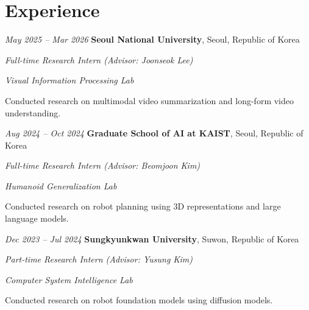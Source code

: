 \section{Experience}

\begin{twocolentry}{\textit{May 2025 – Mar 2026}}
    \textbf{Seoul National University}, Seoul, Republic of Korea

    \textit{Full-time Research Intern (Advisor: Joonseok Lee)}

    \textit{Visual Information Processing Lab}\href{https://viplab.snu.ac.kr/viplab/index.html}{}
\end{twocolentry}
\begin{onecolentry}
    \begin{highlights}
        \item Conducted research on multimodal video summarization and long-form video understanding.
    \end{highlights}
\end{onecolentry}

\vspace{0.1 cm}

\begin{twocolentry}{\textit{Aug 2024 – Oct 2024}}
    \textbf{Graduate School of AI at KAIST}, Seoul, Republic of Korea

    \textit{Full-time Research Intern (Advisor: Beomjoon Kim)}

    \textit{Humanoid Generalization Lab}\href{https://www.hugelab.org/}{}
\end{twocolentry}
\begin{onecolentry}
    \begin{highlights}
        \item Conducted research on robot planning using 3D representations and large language models.
    \end{highlights}
\end{onecolentry}

\vspace{0.1 cm}

\begin{twocolentry}{\textit{Dec 2023 – Jul 2024}}
    \textbf{Sungkyunkwan University}, Suwon, Republic of Korea

    \textit{Part-time Research Intern (Advisor: Yusung Kim)}

    \textit{Computer System Intelligence Lab}\href{https://sites.google.com/view/yskim525/home}{}
\end{twocolentry}
\begin{onecolentry}
    \begin{highlights}
        \item Conducted research on robot foundation models using diffusion models.
    \end{highlights}
\end{onecolentry}
